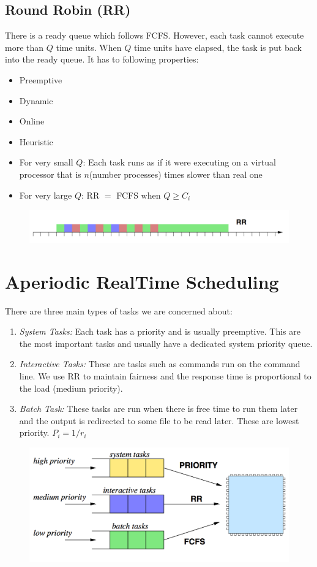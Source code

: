 \documentclass{hw}
\begin{document}
\subsection{Round Robin (RR)}
There is a ready queue which follows FCFS. However, each task cannot execute more
than $Q$ time units. When $Q$ time units have elapsed, the task is put back into 
the ready queue. It has to following properties:
\begin{itemize}
  \item Preemptive
  \item Dynamic
  \item Online
  \item Heuristic
  \item For very small $Q$: Each task runs as if it were executing on a virtual 
    processor that is $n$(number processes) times slower than real one
  \item For very large $Q$: RR $=$ FCFS when $Q \geq C_{i}$
\end{itemize}

\begin{figure}[H]
  \centering
  \includegraphics[scale=.6]{rr}
\end{figure}


\section{Aperiodic Real\-Time Scheduling}
There are three main types of tasks we are concerned about:
\begin{enumerate}
  \item \emph{System Tasks:} Each task has a priority and is usually preemptive.
    This are the most important tasks and usually have a dedicated system 
    priority queue.
  \item \emph{Interactive Tasks:} These are tasks such as commands run on the 
    command line. We use RR to maintain fairness and the response time is 
    proportional to the load (medium priority).
  \item \emph{Batch Task:} These tasks are run when there is free time to run 
    them later and the output is redirected to some file to be read later. These
    are lowest priority. $P_{i} = 1/r_{i}$
\end{enumerate}
\begin{figure}[H]
  \centering
  \includegraphics[scale=.6]{tasks}
\end{figure}
\end{document}
